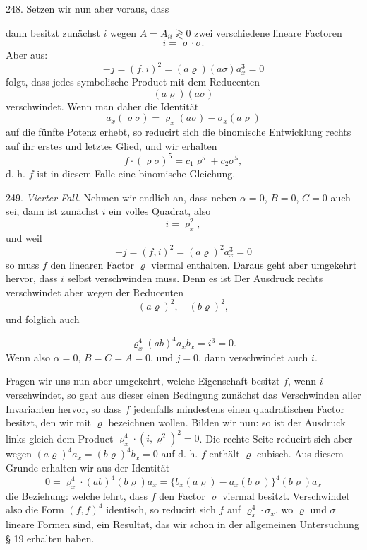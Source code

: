 248. Setzen wir nun aber voraus, dass


dann besitzt zunächst $i$ wegen $A = A_{ii} \gtrless 0$ zwei verschiedene
lineare Factoren
\[
i = \varrho \cdot \sigma .
\]
Aber aus:
\[
-j = (f,i)^2 = (a\varrho)(a\sigma)a_x^3 = 0
\]
folgt, dass jedes symbolische Product mit dem Reducenten
\[
(a\varrho)(a\sigma)
\]
verschwindet. Wenn man daher die Identität
\[
a_x(\varrho\sigma) = \varrho_x(a\sigma) - \sigma_x(a\varrho)
\]
auf die fünfte Potenz erhebt, so reducirt sich die binomische Entwicklung
rechts auf ihr erstes und letztes Glied, und wir erhalten
\[
f\cdot(\varrho\sigma)^5 = c_1\varrho^5 + c_2\sigma^5,
\]
d. h. $f$ ist in diesem Falle eine binomische Gleichung.

249. \textit{Vierter Fall.} Nehmen wir endlich an, dass neben $\alpha = 0$,
$B = 0$, $C = 0$ auch
sei, dann ist zunächst $i$ ein volles Quadrat, also
\[
i = \varrho_x^2,
\]
und weil
\[
-j = (f,i)^2 = (a\varrho)^2 a_x^3 = 0
\]
so muss $f$ den linearen Factor $\varrho$ viermal enthalten. Daraus geht
aber umgekehrt hervor, dass $i$ selbst verschwinden muss. Denn es ist
Der Ausdruck rechts verschwindet aber wegen der Reducenten
\[
(a\varrho)^2,\quad (b\varrho)^2,
\]
und folglich auch


\[
\varrho_x^4(ab)^4 a_x b_x = i^3 = 0.
\]
Wenn also $\alpha = 0$, $B = C = A = 0$, und $j = 0$, dann verschwindet auch $i$.

Fragen wir uns nun aber umgekehrt, welche Eigenschaft besitzt $f$, wenn $i$
verschwindet, so geht aus dieser einen Bedingung zunächst das Verschwinden
aller Invarianten hervor, so dass $f$ jedenfalls mindestens einen
quadratischen Factor besitzt, den wir mit $\varrho$ bezeichnen wollen.
Bilden wir nun:
so ist der Ausdruck links gleich dem Product $\varrho_x^4\cdot(i,\varrho^2)^2 = 0$.
Die rechte Seite reducirt sich aber wegen $(a\varrho)^4 a_x = (b\varrho)^4 b_x = 0$ auf
d. h. $f$ enthält $\varrho$ cubisch. Aus diesem Grunde erhalten wir aus der
Identität
\[
0 = \varrho_x^4\cdot(ab)^4(b\varrho)a_x = \{b_x(a\varrho) - a_x(b\varrho)\}^4(b\varrho)a_x
\]
die Beziehung:
welche lehrt, dass $f$ den Factor $\varrho$ viermal besitzt. Verschwindet
also die Form $(f,f)^4$ identisch, so reducirt sich $f$ auf
$\varrho_x^4\cdot\sigma_x$, wo $\varrho$ und $\sigma$ lineare Formen sind,
ein Resultat, das wir schon in der allgemeinen Untersuchung § 19 erhalten
haben.

